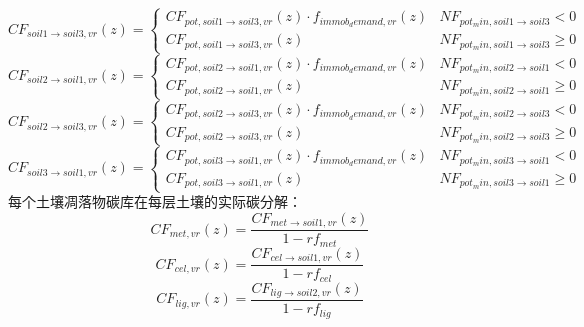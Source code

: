 \begin{equation}
    C F_{soil1 \rightarrow soil3, vr}(z)=\left\{\begin{array}{ll}C F_{pot, soil1 \rightarrow soil3, vr}(z) \cdot f_{i m m o b_{d} e m a n d, vr}(z) & N F_{pot_{m} i n, soil1 \rightarrow soil3}<0 \\ C F_{pot, soil1 \rightarrow soil3, vr}(z) & N F_{pot_{m} i n, soil1 \rightarrow soil3} \geq 0\end{array}\right.
\end{equation}
\begin{equation}
    C F_{soil2 \rightarrow soil1, vr}(z)=\left\{\begin{array}{ll}C F_{pot, soil2 \rightarrow soil1, vr}(z) \cdot f_{i m m o b_{d} e m a n d, vr}(z) & N F_{pot_{m} i n, soil2 \rightarrow soil1}<0 \\ C F_{pot, soil2 \rightarrow soil1, vr}(z) & N F_{pot_{m} i n, soil2 \rightarrow soil1} \geq 0\end{array}\right.
\end{equation}
\begin{equation}
    C F_{soil2 \rightarrow soil3, vr}(z)=\left\{\begin{array}{ll}C F_{pot, soil2 \rightarrow soil3, vr}(z) \cdot f_{i m m o b_{d} e m a n d, vr}(z) & N F_{pot_{m} i n, soil2 \rightarrow soil3}<0 \\ C F_{pot, soil2 \rightarrow soil3, vr}(z) & N F_{pot_{m} i n, soil2 \rightarrow soil3} \geq 0\end{array}\right.
\end{equation}
\begin{equation}
    C F_{soil3 \rightarrow soil1, vr}(z)=\left\{\begin{array}{ll}C F_{pot, soil3 \rightarrow soil1, vr}(z) \cdot f_{i m m o b_{d} e m a n d, vr}(z) & N F_{pot_{m} i n, soil3 \rightarrow soil1}<0 \\ C F_{pot, soil3 \rightarrow soil1, vr}(z) & N F_{pot_{m} i n, soil3 \rightarrow soil1} \geq 0\end{array}\right.
\end{equation}
每个土壤凋落物碳库在每层土壤的实际碳分解：
\begin{equation}
C F_{met, vr}(z)=\frac{C F_{met \rightarrow { soil1,vr }}(z)}{1-r f_{met}}
\end{equation}
\begin{equation}
C F_{cel, vr}(z)=\frac{C F_{cel \rightarrow soil1, vr}(z)}{1-r f_{cel}}
\end{equation}
\begin{equation}
C F_{lig, vr}(z)=\frac{C F_{lig \rightarrow soil2, vr}(z)}{1-r f_{lig}}
\end{equation}
